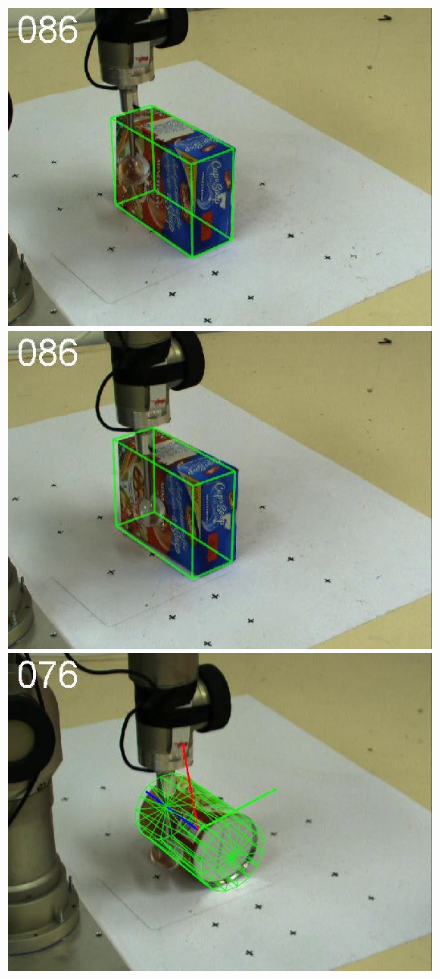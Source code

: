 \begin{figure}[htbp]
{\includegraphics[width=\imgAXwid]{images/A2_LWPR1_399_1}
\includegraphics[width=\imgAXwid]{images/A2_2exp_87_1}
\includegraphics[width=\imgAXwid]{images/A3_2exp_39_1}
}
\end{figure}
